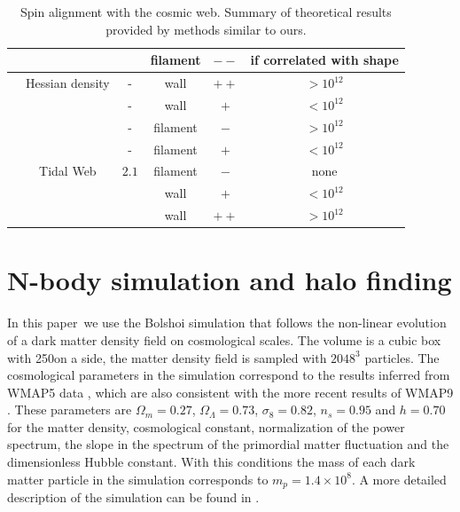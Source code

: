 \documentclass[useAMS,usenatbib]{mn2e}
\newcommand{\documentname}{paper~}
\newcommand{\hMpc}{{\ifmmode{h^{-1}{\rm Mpc}}\else{$h^{-1}$Mpc }\fi}}
\newcommand{\hMsun}{{\ifmmode{h^{-1}{\rm
        {M_{\odot}}}}\else{$h^{-1}{\rm{M_{\odot}}}$~}\fi}}
\begin{document}
\begin{table}
\begin{tabular}{cccccc}
& &  & 
filament & $--$ & if correlated with shape\\\hline

\cite{AragonCalvo2007} & Hessian density & - &
wall & $++$ & $>10^{12}$\hMsun\\


& & - &
wall & $+$ & $<10^{12}$\hMsun\\

& & - &
filament& $-$ & $>10^{12}$\hMsun\\


& & - &
filament& $+$ & $<10^{12}$\hMsun\\\hline



\cite{Hahn2007} & Tidal Web & $2.1$ & filament & $-$& none\\

& & &
wall& $+$ & $<10^{12}$\hMsun\\
& &    &
wall & $++$ & $>10^{12}$\hMsun\\\hline \hline

\end{tabular}
\caption{Spin alignment with the cosmic web. Summary of theoretical
  results provided by methods similar to ours.}

\end{table}



\section{N-body simulation and halo finding}
\label{sec:nbody}

In this \documentname we use the Bolshoi simulation that follows the
non-linear evolution of a dark matter density field on cosmological
scales. The volume is a cubic box with 250\hMpc on a side, the matter
density field is sampled with $2048^3$ particles. The  
cosmological parameters in the simulation correspond to the results
inferred from WMAP5 data \citep{2009ApJS..180..306D}, which are also consistent with the more
recent results of WMAP9 \citep{2013ApJS..208...19H}. These parameters are $\Omega_m=0.27$,
$\Omega_{\Lambda} =0.73$, $\sigma_8=0.82$, $n_s=0.95$ and $h=0.70$ for the
matter density, cosmological constant, normalization of the power
spectrum, the slope in the spectrum of the primordial matter
fluctuation and the dimensionless Hubble constant. With this
conditions the mass of each dark matter particle in the simulation
corresponds to $m_p=1.4\times 10^{8}$\hMsun. A more detailed
description of the simulation can be found in
\citep{2011ApJ...740..102K}. 
\end{document}
